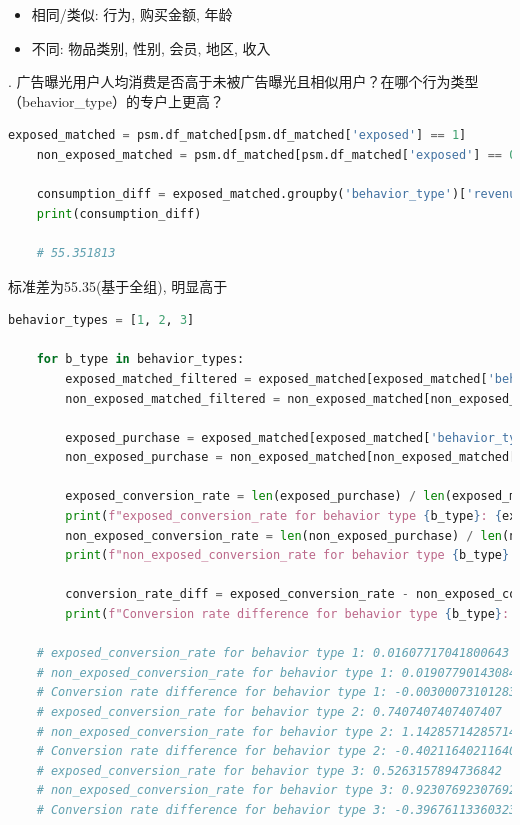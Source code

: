 \documentclass[a4paper]{article}
\begin{document}
\begin{itemize}
    \item 相同/类似: 行为, 购买金额, 年龄
    \item 不同: 物品类别, 性别, 会员, 地区, 收入
\end{itemize}

.	广告曝光用户人均消费是否高于未被广告曝光且相似用户？在哪个行为类型（behavior\_type）的专户上更高？

\begin{lstlisting}[language=Python]
    exposed_matched = psm.df_matched[psm.df_matched['exposed'] == 1]
    non_exposed_matched = psm.df_matched[psm.df_matched['exposed'] == 0]
    
    consumption_diff = exposed_matched.groupby('behavior_type')['revenue'].mean() - non_exposed_matched.groupby('behavior_type')['revenue'].mean()
    print(consumption_diff)

    # 55.351813
\end{lstlisting}

标准差为55.35(基于全组), 明显高于


\begin{lstlisting}[language=Python]
    behavior_types = [1, 2, 3]

    for b_type in behavior_types:
        exposed_matched_filtered = exposed_matched[exposed_matched['behavior_type'] == b_type]
        non_exposed_matched_filtered = non_exposed_matched[non_exposed_matched['behavior_type'] == b_type]

        exposed_purchase = exposed_matched[exposed_matched['behavior_type'] == 4]
        non_exposed_purchase = non_exposed_matched[non_exposed_matched['behavior_type'] == 4]

        exposed_conversion_rate = len(exposed_purchase) / len(exposed_matched_filtered)
        print(f"exposed_conversion_rate for behavior type {b_type}: {exposed_conversion_rate}")
        non_exposed_conversion_rate = len(non_exposed_purchase) / len(non_exposed_matched_filtered)
        print(f"non_exposed_conversion_rate for behavior type {b_type}: {non_exposed_conversion_rate}")

        conversion_rate_diff = exposed_conversion_rate - non_exposed_conversion_rate
        print(f"Conversion rate difference for behavior type {b_type}: {conversion_rate_diff}")

    # exposed_conversion_rate for behavior type 1: 0.01607717041800643
    # non_exposed_conversion_rate for behavior type 1: 0.019077901430842606
    # Conversion rate difference for behavior type 1: -0.003000731012836176
    # exposed_conversion_rate for behavior type 2: 0.7407407407407407
    # non_exposed_conversion_rate for behavior type 2: 1.1428571428571428
    # Conversion rate difference for behavior type 2: -0.4021164021164021
    # exposed_conversion_rate for behavior type 3: 0.5263157894736842
    # non_exposed_conversion_rate for behavior type 3: 0.9230769230769231
    # Conversion rate difference for behavior type 3: -0.39676113360323895
\end{lstlisting}
\end{document}
